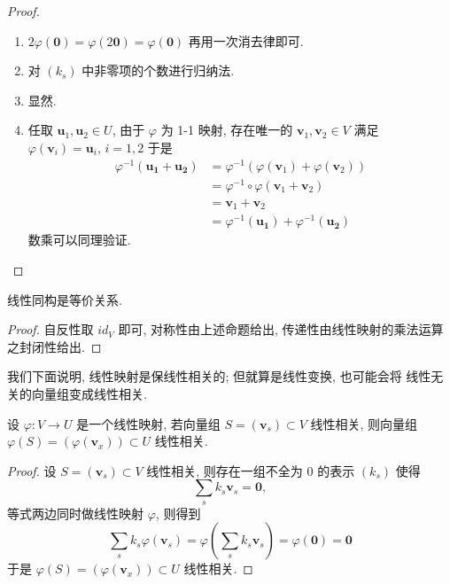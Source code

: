 \documentclass[UTF8]{book}
\begin{document}
\begin{proof}
    \begin{enumerate}[(1)]
        \item $2\varphi(\boldsymbol{0}) = \varphi(2\boldsymbol{0}) 
        = \varphi(\boldsymbol{0})$ 再用一次消去律即可. 
        \item 对 $(k_s)$ 中非零项的个数进行归纳法. 
        \item 显然. 
        \item 任取 $\boldsymbol{u}_1,\boldsymbol{u}_2 \in U$, 
        由于 $\varphi$ 为 1-1 映射, 
        存在唯一的 $\boldsymbol{v}_1,\boldsymbol{v}_2 \in V$ 
        满足 $\varphi(\boldsymbol{v}_i)=\boldsymbol{u}_i,\,i=1,2$ 
        于是 
        $$\begin{aligned}
        \varphi^{-1}(\boldsymbol{u_1}+\boldsymbol{u_2})&= 
        \varphi^{-1}(\varphi(\boldsymbol{v}_1)+\varphi(\boldsymbol{v}_2))\\
        &= \varphi^{-1}\circ\varphi (\boldsymbol{v}_1+\boldsymbol{v}_2) \\
        &= \boldsymbol{v}_1+\boldsymbol{v}_2 \\
        &= \varphi^{-1}(\boldsymbol{u_1}) + \varphi^{-1}(\boldsymbol{u_2})
        \end{aligned}$$
        数乘可以同理验证. 
    \end{enumerate}
\end{proof}

\begin{proposition}
    线性同构是等价关系. 
\end{proposition}

\begin{proof}
    自反性取 $id_V$ 即可, 对称性由上述命题给出, 
    传递性由线性映射的乘法运算之封闭性给出. 
\end{proof}

我们下面说明, 线性映射是保线性相关的; 但就算是线性变换, 也可能会将
线性无关的向量组变成线性相关. 

\begin{proposition}
    设 $\varphi: V \to U$ 是一个线性映射, 
    若向量组 $S = (\boldsymbol{v}_s) \subset V$ 线性相关, 
    则向量组 $\varphi(S) = (\varphi(\boldsymbol{v}_x))\subset U$ 
    线性相关.  
\end{proposition}

\begin{proof}
    设 $S = (\boldsymbol{v}_s) \subset V$ 线性相关, 
    则存在一组不全为 0 的表示 $(k_s)$ 使得 
    $$\sum_{s} k_s \boldsymbol{v}_s = \boldsymbol{0},$$ 
    等式两边同时做线性映射 $\varphi$, 则得到 
    $$\sum_s k_s \varphi(\boldsymbol{v}_s) 
    =\varphi\left(\sum_{s} k_s \boldsymbol{v}_s\right)
    =\varphi(\boldsymbol{0}) =\boldsymbol{0} $$
    于是 $\varphi(S) = (\varphi(\boldsymbol{v}_x))\subset U$ 线性相关. 
\end{proof}
\end{document}
